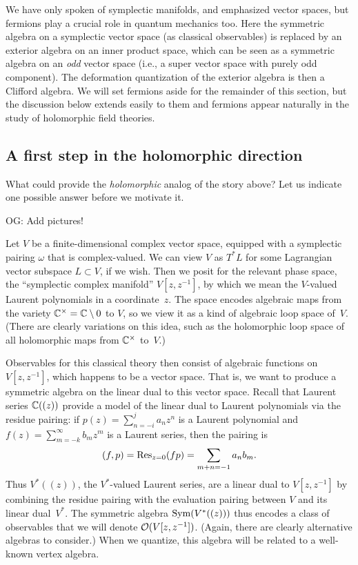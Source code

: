 \documentclass[11pt]{amsart}
\def\owen#1{{\textcolor{violet!65!black}{OG: {#1}}}}
\begin{document}
\begin{rmk}
We have only spoken of symplectic manifolds, and emphasized vector spaces,
but fermions play a crucial role in quantum mechanics too.
Here the symmetric algebra on a symplectic vector space (as classical observables) 
is replaced by an exterior algebra on an inner product space,
which can be seen as a symmetric algebra on an {\em odd} vector space
(i.e., a super vector space with purely odd component).
The deformation quantization of the exterior algebra is then a Clifford algebra.
We will set fermions aside for the remainder of this section,
but the discussion below extends easily to them and fermions appear naturally in the study of holomorphic field theories.
\end{rmk}

\subsection{A first step in the holomorphic direction}

What could provide the {\em holomorphic} analog of the story above?
Let us indicate one possible answer before we motivate it.

\owen{Add pictures!}

Let $V$ be a finite-dimensional complex vector space, equipped with a symplectic pairing $\omega$ that is complex-valued.
We can view $V$ as $T^* L$ for some Lagrangian vector subspace $L \subset V$, if we wish.
Then we posit for the relevant phase space, the ``symplectic complex manifold'' $V[z,z^{-1}]$,
by which we mean the $V$-valued Laurent polynomials in a coordinate~$z$.
The space encodes algebraic maps from the variety $\mathbb C^\times = \mathbb C \setminus 0$ to $V$,
so we view it as a kind of algebraic loop space of~$V$.
(There are clearly variations on this idea, such as the holomorphic loop space of all holomorphic maps from $\mathbb C^\times$ to~$V$.)

Observables for this classical theory then consist of algebraic functions on $V[z,z^{-1}]$, 
which happens to be a vector space.
That is, we want to produce a symmetric algebra on the linear dual to this vector space.
Recall that Laurent series $\mathbb C((z))$ provide a model of the linear dual to Laurent polynomials via the residue pairing: if $p(z) = \sum_{n = -i}^j a_n z^n$ is a Laurent polynomial and $f(z) = \sum_{m = -k}^\infty b_m z^m$ is a Laurent series, then the pairing is
\[
(f, p) = {\rm Res}_{z=0}(f p) = \sum_{m+n=-1} a_n b_m.
\]
Thus $V^* ((z))$, the $V^*$-valued Laurent series, are a linear dual to $V[z,z^{-1}]$ by combining the residue pairing with the evaluation pairing between $V$ and its linear dual~$V^*$.
The symmetric algebra $\operatorname{Sym}(V^* ((z)))$ thus encodes a class of observables that we will denote $\mathcal O(V[z,z^{-1}])$.
(Again, there are clearly alternative algebras to consider.)
When we quantize, this algebra will be related to a well-known vertex algebra.
\end{document}
